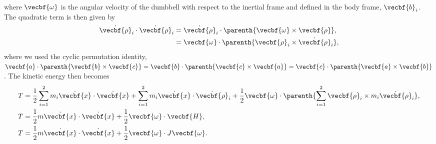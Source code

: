 \documentclass[11pt, reqno]{article}    %
\begin{document}
where \( \vecbf{\omega} \) is the angular velocity of the dumbbell with respect to the inertial frame and defined in the body frame, \( \vecbf{b}_i\).
The quadratic term is then given by
\begin{align}
    \dot{\vecbf{\rho}}_i \cdot \dot{\vecbf{\rho}}_i &= \dot{\vecbf{\rho}}_i \cdot \parenth{\vecbf{\omega} \times \vecbf{\rho}} ,\nonumber \\
    &= \vecbf{\omega} \cdot \parenth{\vecbf{\rho}_i \times \dot{\vecbf{\rho}}_i } ,
\end{align}
where we used the cyclic permutation identity, \( \vecbf{a} \cdot \parenth{\vecbf{b} \times \vecbf{c}} = \vecbf{b} \cdot \parenth{\vecbf{c} \times \vecbf{a}}  = \vecbf{c} \cdot \parenth{\vecbf{a} \times \vecbf{b}}\).
The kinetic energy then becomes
\begin{align}
    T &= \frac{1}{2} \sum_{i=1}^2 m_i \dot{\vecbf{x}} \cdot \dot{\vecbf{x}}  + \sum_{i=1}^2 m_i \dot{\vecbf{x}} \cdot \dot{\vecbf{\rho}}_i + \frac{1}{2} \vecbf{\omega} \cdot \parenth{\sum_{i=1}^2 \vecbf{\rho}_i \times m_i \dot{\vecbf{\rho}}_i } , \nonumber\\
    T &= \frac{1}{2} m \dot{\vecbf{x}} \cdot \dot{\vecbf{x}} + \frac{1}{2} \vecbf{\omega}\cdot \vecbf{H} , \nonumber \\
    T &= \frac{1}{2} m \dot{\vecbf{x}} \cdot \dot{\vecbf{x}} + \frac{1}{2} \vecbf{\omega}\cdot J \vecbf{\omega} .
\end{align}


%

\end{document}
